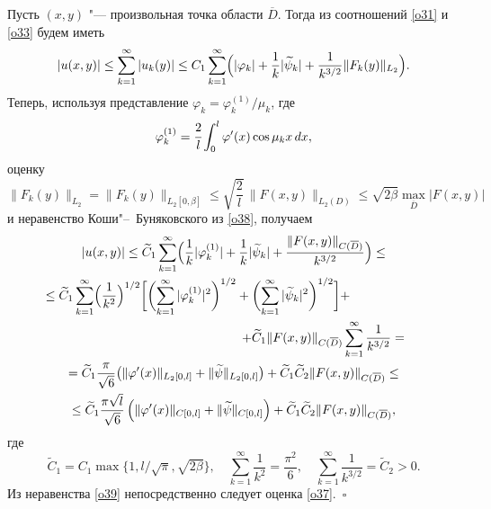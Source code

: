 Пусть $(x,y)$ "--- произвольная точка области $\overline{D}$. 
Тогда из соотношений \eqref{o31} и \eqref{o33} будем иметь
\begin{equation}
\label{o38}
|u(x,y)|\leq\sum_{k=1}^{\infty}|u_k(y)|\leq C_1\sum_{k=1}^{\infty} 
\Bigl(|\varphi_k|+\frac{1}{k}|\widetilde{\psi}_k|+\frac{1}{k^{3/2}}\|F_k(y)\|_{L_2}\Bigr).
\end{equation}
Теперь, используя представление $\varphi_k=\varphi_k^{(1)}/\mu_k$, где 
$$\varphi_k^{(1)}=\cfrac{2}{l}\int _{0}^{l}\varphi'(x)\cos\mu_kx\,dx,$$ оценку
$$
\|F_k(y)\|_{L_2}=\|F_k(y)\|_{L_2[0,\beta]}\leq\sqrt{\frac{2}{l}}\,\|F(x,y)\|_{L_2(D)}\leq \sqrt{2\beta}\max_{\overline{D}}|F(x,y)|
$$
и неравенство Коши"--~Буняковского из \eqref{o38}, получаем
\begin{multline}
|u(x,y)|\leq\widetilde{C}_1\sum\limits_{k=1}^{\infty}
\Bigl(\frac{1}{k}|\varphi^{(1)}_k|+ \frac{1}{k}|\widetilde{\psi}_k|+\frac{\|F(x,y)\|_{C(\overline{D})}}{k^{3/2}}\Bigr)\leq
\\
\leq\widetilde{C}_1\sum\limits_{k=1}^{\infty}
\Bigl(\frac{1}{k^2}\Bigr)^{1/2} 
\biggl[
\biggl(\sum\limits_{k=1}^{\infty}|\varphi^{(1)}_k|^2\biggr)^{1/2}+ 
\biggl(\sum\limits_{k=1}^{\infty}|\widetilde{\psi}_k|^2\biggr)^{1/2}\biggr]+ \hspace{2cm}
\\
\hspace{5cm}+
\widetilde{C}_1\|F(x,y)\|_{C(\overline{D})}\sum\limits_{k=1}^{\infty}\frac{1}{k^{3/2}}=
\\
=\widetilde{C}_1\frac{\pi}{\sqrt{6}} 
\bigl(\|\varphi'(x)\|_{L_2[0,l]}+\|\widetilde{\psi}\|_{L_2[0,l]}\bigr)+ \widetilde{C}_1\widetilde{C}_2\|F(x,y)\|_{C(\overline{D})}\leq
\\
\label{o39}
\leq\widetilde{C}_1\frac{\pi\sqrt{l}}{\sqrt{6}}\left(\|\varphi'(x)\|_{C[0,l]}+\|\widetilde{\psi}\|_{C[0,l]}\right)+ \widetilde{C}_1\widetilde{C}_2\|F(x,y)\|_{C(\overline{D})},
\end{multline}
где 
$$\widetilde{C}_1=C_1\max\{1,l/\sqrt{\pi}, \sqrt{2\beta}\},\quad  
\sum\limits_{k=1}^{\infty} \frac 1{k^2}= \frac{\pi^2}6,\quad  \sum\limits_{k=1}^{\infty} \frac1 {k^{3/2}}=\widetilde{C}_2>0.$$
Из неравенства \eqref{o39} непосредственно следует оценка \eqref{o37}.~$\square$

\smallskip


